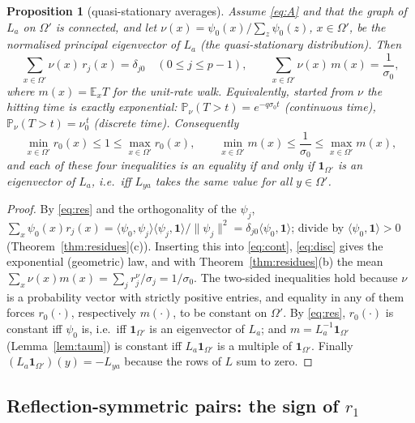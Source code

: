 \documentclass[11pt,a4paper]{article}
\newcommand{\one}{\mathbf 1}
\newcommand{\E}{\mathbb E}
\newcommand{\PP}{\mathbb P}
\newcommand{\ip}[2]{\langle #1,#2\rangle}
\theoremstyle{plain}
\newtheorem{proposition}[theorem]{Proposition}
\theoremstyle{definition}
\numberwithin{equation}{section}
\begin{document}
\begin{proposition}[quasi-stationary averages]\label{prop:qsd}
Assume \eqref{eq:A} and that the graph of $L_a$ on $\Omega'$ is connected, and let $\nu(x)=\psi_0(x)/\sum_z\psi_0(z)$, $x\in\Omega'$, be the normalised principal eigenvector of $L_a$ (the quasi-stationary distribution). Then
\begin{equation}\label{eq:qsd}
\sum_{x\in\Omega'}\nu(x)\,r_j(x)=\delta_{j0}\quad(0\le j\le p-1),\qquad \sum_{x\in\Omega'}\nu(x)\,m(x)=\frac1{\sigma_0},
\end{equation}
where $m(x)=\E_xT$ for the unit-rate walk. Equivalently, started from $\nu$ the hitting time is exactly exponential: $\PP_\nu(T>t)=e^{-q\sigma_0t}$ (continuous time), $\PP_\nu(T>t)=\nu_0^{\,t}$ (discrete time). Consequently
\[
\min_{x\in\Omega'}r_0(x)\le1\le\max_{x\in\Omega'}r_0(x),\qquad \min_{x\in\Omega'}m(x)\le\frac1{\sigma_0}\le\max_{x\in\Omega'}m(x),
\]
and each of these four inequalities is an equality if and only if $\one_{\Omega'}$ is an eigenvector of $L_a$, i.e.\ iff $L_{ya}$ takes the same value for all $y\in\Omega'$.
\end{proposition}
\begin{proof}
By \eqref{eq:res} and the orthogonality of the $\psi_j$, $\sum_x\psi_0(x)r_j(x)=\ip{\psi_0}{\psi_j}\ip{\psi_j}{\one}/\|\psi_j\|^2=\delta_{j0}\ip{\psi_0}{\one}$; divide by $\ip{\psi_0}\one>0$ (Theorem~\ref{thm:residues}(c)). Inserting this into \eqref{eq:cont}, \eqref{eq:disc} gives the exponential (geometric) law, and with Theorem~\ref{thm:residues}(b) the mean $\sum_x\nu(x)m(x)=\sum_jr_j^{\nu}/\sigma_j=1/\sigma_0$. The two-sided inequalities hold because $\nu$ is a probability vector with strictly positive entries, and equality in any of them forces $r_0(\cdot)$, respectively $m(\cdot)$, to be constant on $\Omega'$. By \eqref{eq:res}, $r_0(\cdot)$ is constant iff $\psi_0$ is, i.e.\ iff $\one_{\Omega'}$ is an eigenvector of $L_a$; and $m=L_a^{-1}\one_{\Omega'}$ (Lemma~\ref{lem:taum}) is constant iff $L_a\one_{\Omega'}$ is a multiple of $\one_{\Omega'}$. Finally $(L_a\one_{\Omega'})(y)=-L_{ya}$ because the rows of $L$ sum to zero.
\end{proof}

\subsection{Reflection-symmetric pairs: the sign of $r_1$}
\end{document}
